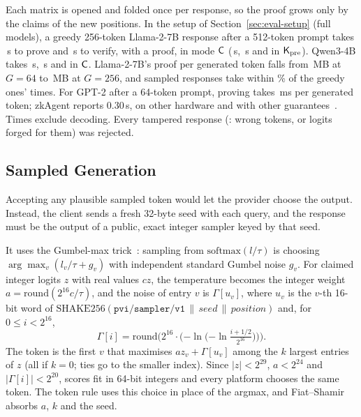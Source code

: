  Each matrix is opened and folded once per response, so the proof grows only by the
claims of the new positions. In the setup of Section~\ref{sec:eval-setup} (full models), a greedy
256-token Llama-2-7B response after a 512-token prompt takes \GenLlamaProveC{}\,s to prove and \GenLlamaVerifyC{}\,s to verify, with a
\GenLlamaProofC{} proof, in mode $\mathsf{C}$ (\GenLlamaProveK{}\,s, \GenLlamaVerifyK{}\,s and \GenLlamaProofK{} in $\mathsf{K}_{\mathrm{pre}}$). Qwen3-4B takes
\GenQwenProveC{}\,s, \GenQwenVerifyC{}\,s and \GenQwenProofC{} in $\mathsf{C}$. Llama-2-7B's proof per generated token falls from
\GenLlamaMBPerTokenShort{}\,MB at $G=64$ to \GenLlamaMBPerTokenLong{}\,MB at $G=256$, and sampled responses take
within \GenSampledWithin{}\% of the greedy ones' times. For GPT-2 after a 64-token prompt, proving takes
\GenGptMsPerToken{}\,ms per generated token; zkAgent reports 0.30\,s, on other hardware and with other
guarantees~\cite{zkagent}. Times exclude decoding. Every tampered response (\OutcomeTampersGen{}: wrong tokens, or logits forged for them) was rejected.

\subsection{Sampled Generation}
\label{sec:gen-sampling}

Accepting any plausible sampled token would let the provider choose the output. Instead, the
client sends a fresh 32-byte seed with each query, and the response must be the output of a
public, exact integer sampler keyed by that seed.

 It uses the Gumbel-max trick~\cite{gumbel1954,maddison2014astar}: sampling
from $\mathrm{softmax}(l/\tau)$ is choosing $\arg\max_v(l_v/\tau+g_v)$ with independent standard
Gumbel noise $g_v$. For claimed integer logits $z$ with real values $cz$, the temperature becomes
the integer weight $a=\mathrm{round}(2^{16}c/\tau)$, and the noise of entry $v$ is $\Gamma[u_v]$,
where $u_v$ is the $v$-th 16-bit word of
$\mathrm{SHAKE256}(\texttt{pvi/sampler/v1}\,\|\,\mathit{seed}\,\|\,\mathit{position})$ and, for
$0\le i<2^{16}$,
\begin{equation}
  \Gamma[i] = \mathrm{round}\Big(2^{16}\cdot\big({-\ln}\big({-\ln}\tfrac{i+1/2}{2^{16}}\big)\big)\Big).
  \label{eq:gumbel-table}
\end{equation}
The token is the first $v$ that maximises $az_v+\Gamma[u_v]$ among the $k$ largest entries of $z$
(all if $k=0$; ties go to the smaller index). Since $|z|<2^{29}$, $a<2^{24}$ and
$|\Gamma[i]|<2^{20}$, scores fit in 64-bit integers and every platform chooses the same token.
The token rule uses this choice in place of the argmax, and Fiat--Shamir absorbs $a$, $k$ and the
seed.

